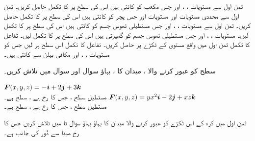 ثمن اول سے مستویات ، ، اور   جس  مکعب  کو کاٹتی ہیں اس کی سطح پر   کا تکمل حاصل کریں۔
ثمن اول سے  محددی  مستویات اور  مستویات   اور   جس پچر  کو کاٹتی ہیں اس کی سطح پر  کا تکمل حاصل کریں۔
ثمن اول سے مستویات ، ، اور  جس مستطیلی  ٹھوس جسم  کو کاٹتی ہیں اس کی سطح پر  کا تکمل لیں۔
 مستویات ، ، اور   جس  مستطیلی  ٹھوس جسم کو  گھیرتی ہیں اس کی سطح پر   کا تکمل لیں۔
تفاعل  کا تکمل ثمن اول  میں واقع مستوی  کے ٹکڑے پر حاصل کریں۔
    تفاعل   کا تکمل اس  سطح پر لیں جس کو مستویات ، ، اور   مکافی   بیلن  سے  کاٹتی ہیں۔

 سطح       کو عبور کرنے والا ، میدان  کا  ، بہاؤ سوال  اور
  سوال  میں تلاش کریں۔

\({{\boldsymbol{F}}}(x,y,z)=-{\boldsymbol{i}}+2{\boldsymbol{j}}+3{\boldsymbol{k}}\)\\
مستطیل سطح  ، جس کا رخ  ہے ، سطح  ہے۔
\({{\boldsymbol{F}}}(x,y,z)=yx^2{\boldsymbol{i}}-2{\boldsymbol{j}}+xz{\boldsymbol{k}}\)\\
مستطیل سطح ،  جس کا رخ  ہے ، سطح  ہے۔

ثمن اول میں کرہ  کے اس    ٹکڑے کو عبور  کرنے والا میدان  کا بہاؤ   
بہاؤ  سوال  تا  میں تلاش کریں جس کا رخ مبدا سے دُور   کی جانب  ہے۔

